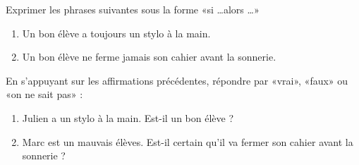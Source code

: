
\begin{exercice}\label{exosmath-0782}

    Exprimer les phrases suivantes sous la forme «si \ldots alors \ldots» 
    \begin{enumerate}
        \item
            Un bon élève a toujours un stylo à la main.
        \item
            Un bon élève ne ferme jamais son cahier avant la sonnerie.
    \end{enumerate}
    En s'appuyant sur les affirmations précédentes, répondre par «vrai», «faux» ou «on ne sait pas» :
    \begin{enumerate}
        \item
            Julien a un stylo à la main. Est-il un bon élève ?
        \item
            Marc est un mauvais élèves. Est-il certain qu'il va fermer son cahier avant la sonnerie ?
    \end{enumerate}

\end{exercice}
